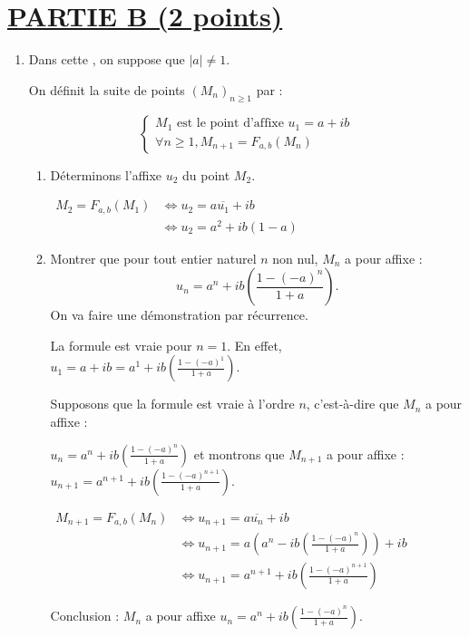 \documentclass[12pt,a4paper]{article}
\begin{document}
		\section*{\underline{PARTIE B (2 points)}}
		\begin{enumerate}
		\item Dans cette , on suppose que $|a| \neq 1$.
		
			On définit la suite de points $(M_n)_{n \geq 1}$ par :
			
			\[
				\begin{cases} 
					M_1 \text{ est le point d’affixe } u_1 = a + i b \\
					\forall n \geq 1, M_{n+1} = F_{a,b}(M_n)
			\end{cases} \]
			\begin{enumerate}
			\item Déterminons l’affixe $u_2$ du point $M_2$.
			
				\(
				\begin{aligned}
				M_2 = F_{a,b}(M_1) &\Leftrightarrow u_2 = a \overline{u_1} + i b \\
									&\Leftrightarrow u_2 = a^2 + i b(1 - a) 
				\end{aligned}
				\) 
				\item Montrer que pour tout entier naturel $n$ non nul, $M_n$ a pour affixe :
				\[ u_n = a^n + i b \left( \frac{1 - (-a)^n}{1 + a} \right). \]
				On va faire une démonstration par récurrence.
				
				La formule est vraie pour $n = 1$. En effet, $u_1 = a + i b = a^1 + i b \left( \frac{1 - (-a)^1}{1 + a} \right)$.
				
     Supposons que la formule est vraie à l’ordre $n$, c’est-à-dire que $M_n$ a pour affixe :
     
      $u_n = a^n + i b \left( \frac{1 - (-a)^n}{1 + a} \right)$ et montrons que $M_{n+1}$ a pour affixe : $u_{n+1} = a^{n+1} + i b \left( \frac{1 - (-a)^{n+1}}{1 + a} \right)$.

\(
\begin{aligned}
M_{n+1} = F_{a,b}(M_n) &\Leftrightarrow u_{n+1} = a \overline{u_n} + i b\\
					   &\Leftrightarrow u_{n+1} = a \left( a^n - i b \left( \frac{1 - (-a)^n}{1 + a} \right) \right) + i b\\
					   &\Leftrightarrow u_{n+1} = a^{n+1} + i b \left( \frac{1 - (-a)^{n+1}}{1 + a} \right)
\end{aligned}
\)      
      

Conclusion : $M_n$ a pour affixe $\boxed{u_n = a^n + i b \left( \frac{1 - (-a)^n}{1 + a} \right)}$.
			\end{enumerate}
		\end{enumerate}
		
\end{document}
